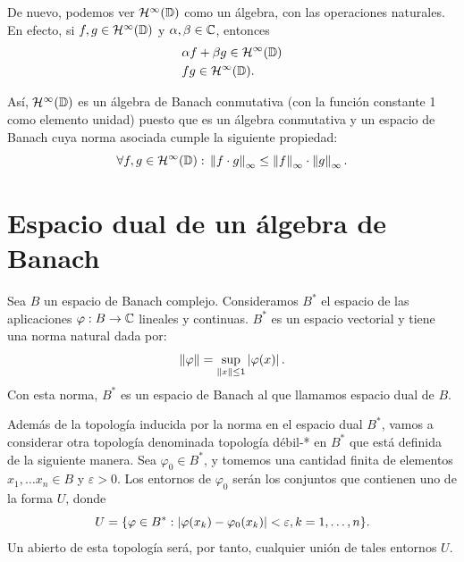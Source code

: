 \medskip

De nuevo, podemos ver $\mathcal{H}^{\infty}(\mathbb{D})$ como un álgebra, con las operaciones naturales. En efecto, si $f, g \in \mathcal{H}^{\infty}(\mathbb{D})$ y $\alpha, \beta \in \mathbb{C}$, entonces
\begin{equation*}
    \begin{split}
        & \alpha f + \beta g \in \mathcal{H}^{\infty}(\mathbb{D}) \\
        & fg \in \mathcal{H}^{\infty}(\mathbb{D}).
    \end{split}
\end{equation*}

Así, $\mathcal{H}^{\infty}(\mathbb{D})$ es un álgebra de Banach conmutativa (con la función constante 1 como elemento unidad) puesto que es un álgebra conmutativa y un espacio de Banach cuya norma asociada cumple la siguiente propiedad:
\begin{equation*}
    \forall f, g \in \mathcal{H}^{\infty}(\mathbb{D}): \, \left\lVert f \cdot g\right\rVert_{\infty} \leq \left\lVert f\right\rVert_{\infty} \cdot \left\lVert g\right\rVert_{\infty}.
\end{equation*}

\section{Espacio dual de un álgebra de Banach}

\begin{definition}
    Sea $B$ un espacio de Banach complejo. Consideramos $B^*$ el espacio de las aplicaciones $\varphi: B \to \mathbb{C}$ lineales y continuas. $B^*$ es un espacio vectorial y tiene una norma natural dada por:
    \begin{equation*}
        \left\lVert\varphi\right\rVert = \sup_{\left\lVert x\right\rVert \leq 1} \left\lvert\varphi(x)\right\rvert.
    \end{equation*}
    Con esta norma, $B^*$ es un espacio de Banach al que llamamos espacio dual de $B$.
\end{definition}
\medskip

Además de la topología inducida por la norma en el espacio dual $B^*$, vamos a considerar otra topología denominada topología débil-* en $B^*$ que está definida de la siguiente manera. Sea $\varphi_0 \in B^*$, y tomemos una cantidad finita de elementos $x_1, \dots x_n \in B$ y $\varepsilon > 0$. Los entornos de $\varphi_0$ serán los conjuntos que contienen uno de la forma $U$, donde
\begin{equation*}
U = \{ \varphi \in B^*: \left\lvert\varphi(x_k) - \varphi_0 (x_k)\right\rvert < \varepsilon, k = 1, \dots, n\}.
\end{equation*}
Un abierto de esta topología será, por tanto, cualquier unión de tales entornos $U$. \\

